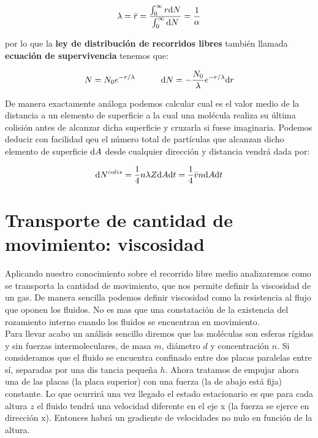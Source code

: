 \documentclass[12pt]{book}
\begin{document}
\begin{equation}
\lambda = \bar{r} = \dfrac{\int_{0}^{\infty} r \mathrm{d} N}{\int_{0}^{\infty} \mathrm{d} N} = \dfrac{1}{\alpha}
\end{equation}

por lo que la \textbf{ley de distribución de recorridos libres} también llamada \textbf{ecuación de supervivencia} tenemos que:

\begin{equation}
N = N_0 e^{-r/\lambda} \quad \quad \quad \mathrm{d} N = - \dfrac{N_0}{\lambda} e^{-r / \lambda} \mathrm{d} r
\end{equation}

De manera exactamente análoga podemos calcular cual es el valor medio de la distancia a un elemento de superficie a la cual una molécula realiza su última colisión antes de alcanzar dicha superficie y cruzarla si fuese imaginaria. Podemos deducir con facilidad qeu el número total de partículas que alcanzan dicho elemento de superficie $\mathrm{d} A$ desde cualquier dirección y distancia vendrá dada por:

\begin{equation}
\mathrm{d} N^{colis} = \dfrac{1}{4} n \lambda Z \mathrm{d} A \mathrm{d} t = \dfrac{1}{4} \bar{v} n \mathrm{d} A \mathrm{d} t
\end{equation}

\section{Transporte de cantidad de movimiento: viscosidad}

Aplicando nuestro conocimiento sobre el recorrido libre medio analizaremos como se transporta la cantidad de movimiento, que nos permite definir la viscosidad de un gas. De manera sencilla podemos definir viscosidad como la resistencia al flujo que oponen los fluidos. No es mas que una constatación de la existencia del rozamiento interno cuando los fluidos se encuentran en movimiento. \\

Para llevar acabo un análisis sencillo diremos que las moléculas son esferas rígidas y sin fuerzas intermoleculares, de masa $m$, diámetro $d$ y concentración $n$. Si consideramos que el fluido se encuentra confinado entre dos placas paralelas entre sí, separadas por una dis tancia pequeña $h$. Ahora tratamos de empujar ahora una de las placas (la placa superior) con una fuerza (la de abajo está fija) constante. Lo que ocurrirá una vez llegado el estado estacionario es que para cada altura $z$ el fluido tendrá una velocidad diferente en el eje x (la fuerza se ejerce en dirección x). Entonces habrá un gradiente de velocidades no nulo en función de la altura.\\
\end{document}

